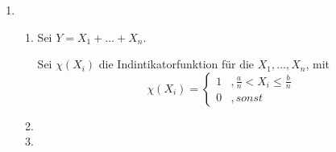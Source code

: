 \documentclass[a4paper]{scrartcl}
\def \blattnr {5}
\begin{document}
\begin{enumerate}[label=\bfseries \blattnr.\arabic*]
\begin{enumerate}
        \end{enumerate}
   
    \item
        \begin{enumerate}
            \item
	      Sei $Y = X_1 + \ldots + X_n$.
	      
	      Sei $\chi(X_i)$ die Indintikatorfunktion für die $X_1, \ldots, X_n$, mit
	      \begin{equation*}
	      \chi(X_i) = \begin{cases}
			    1 &, \frac{a}n < X_i \leq \frac{b}n \\
			    0 &, sonst
	                  \end{cases}
	      \end{equation*}

	      
	    \item

            \item

        \end{enumerate}
   
\end{enumerate}
\end{document}
